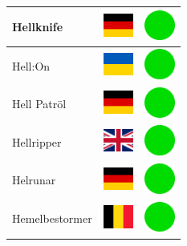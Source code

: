 \documentclass[12pt, a4paper, twoside]{report}
\begin{document}
\begin{center}
\begin{longtable}{|p{5cm}|p{2cm}|p{2cm}|}
 Hellknife                                                  & \includegraphics[width=1cm]{../4x3/de} &   \includegraphics[width=1cm]{../likes/y} \\ \hline
 Hell:On                                                    & \includegraphics[width=1cm]{../4x3/ua} &   \includegraphics[width=1cm]{../likes/y} \\ \hline
 Hell Patröl                                                & \includegraphics[width=1cm]{../4x3/de} &   \includegraphics[width=1cm]{../likes/y} \\ \hline
 Hellripper                                                 & \includegraphics[width=1cm]{../4x3/gb} &   \includegraphics[width=1cm]{../likes/y} \\ \hline
 Helrunar                                                   & \includegraphics[width=1cm]{../4x3/de} &   \includegraphics[width=1cm]{../likes/y} \\ \hline
 Hemelbestormer                                             & \includegraphics[width=1cm]{../4x3/be} &   \includegraphics[width=1cm]{../likes/y} \\ \hline

\end{longtable}
\end{center}
\end{document}
